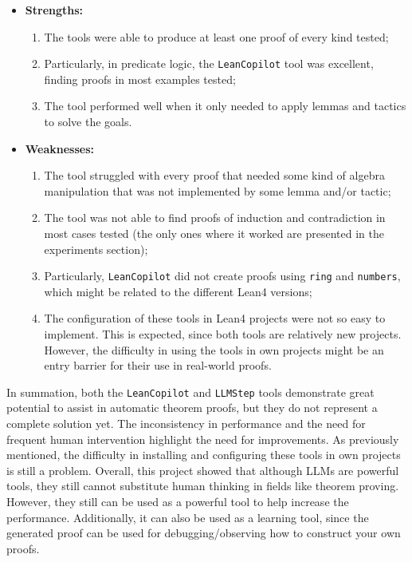 \documentclass[12pt]{article}
\newcommand{\leancopilot}{\texttt{LeanCopilot} }
\newcommand{\llmstep}{\texttt{LLMStep} }
\begin{document}
\begin{itemize}
  \item \textbf{Strengths:}
  \begin{enumerate}[label=(\arabic*)]
    \item The tools were able to produce at least one proof of every kind tested;
    \item Particularly, in predicate logic, the \leancopilot tool was excellent, finding proofs in most examples tested;
    \item The tool performed well when it only needed to apply lemmas and tactics to solve the goals.
  \end{enumerate}
  \item \textbf{Weaknesses:}
  \begin{enumerate}[label=(\arabic*)]
    \item The tool struggled with every proof that needed some kind of algebra manipulation that was not implemented by some lemma and/or tactic;
    \item The tool was not able to find proofs of induction and contradiction in most cases tested (the only ones where it worked are presented in the experiments section);
    \item Particularly, \leancopilot did not create proofs using \texttt{ring} and \texttt{numbers}, which might be related to the different Lean4 versions;
    \item The configuration of these tools in Lean4 projects were not so easy to implement. This is expected, since both tools are relatively new projects. However, the difficulty in using the tools in own projects might be an entry barrier for their use in real-world proofs.
  \end{enumerate}
\end{itemize}

In summation, both the \leancopilot and \llmstep tools demonstrate great potential to assist in automatic theorem proofs, but they do not represent a complete solution yet. The inconsistency in performance and the need for frequent human intervention highlight the need for improvements. As previously mentioned, the difficulty in installing and configuring these tools in own projects is still a problem. Overall, this project showed that although LLMs are powerful tools, they still cannot substitute human thinking in fields like theorem proving. However, they still can be used as a powerful tool to help increase the performance. Additionally, it can also be used as a learning tool, since the generated proof can be used for debugging/observing how to construct your own proofs.
\end{document}
